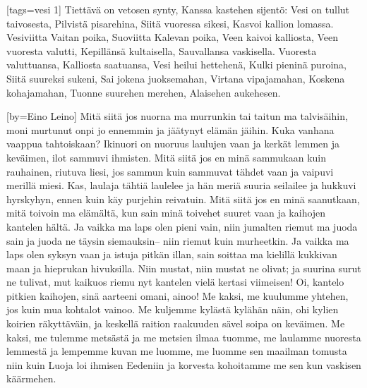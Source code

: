 [tags={vesi 1}]
  \beginverse
    Tiettävä on vetosen synty,
    Kanssa kastehen sijentö:
    Vesi on tullut taivosesta,
    Pilvistä pisarehina,
    Siitä vuoressa sikesi,
    Kasvoi kallion lomassa.
    Vesiviitta Vaitan poika,
    Suoviitta Kalevan poika,
    Veen kaivoi kalliosta,
    Veen vuoresta valutti,
    Kepillänsä kultaisella,
    Sauvallansa vaskisella.
  \endverse
  \beginverse
    Vuoresta valuttuansa,
    Kalliosta saatuansa,
    Vesi heilui hettehenä,
    Kulki pieninä puroina,
    Siitä suureksi sukeni,
    Sai jokena juoksemahan,
    Virtana vipajamahan,
    Koskena kohajamahan,
    Tuonne suurehen merehen,
    Alaisehen aukehesen.
  \endverse
\endsong


\sclearpage
{}[by={Eino Leino}]
  \beginverse
    Mitä siitä jos nuorna ma murrunkin
    tai taitun ma talvisäihin,
    moni murtunut onpi jo ennemmin
    ja jäätynyt elämän jäihin.
    Kuka vanhana vaappua tahtoiskaan?
    Ikinuori on nuoruus laulujen vaan
    ja kerkät lemmen ja keväimen,
    ilot sammuvi ihmisten.
  \endverse
  \beginverse
    Mitä siitä jos en minä sammukaan
    kuin rauhainen, riutuva liesi,
    jos sammun kuin sammuvat tähdet vaan
    ja vaipuvi merillä miesi.
    Kas, laulaja tähtiä laulelee
    ja hän meriä suuria seilailee
    ja hukkuvi hyrskyhyn, ennen kuin
    käy purjehin reivatuin.
  \endverse
  \beginverse
    Mitä siitä jos en minä saanutkaan,
    mitä toivoin ma elämältä,
    kun sain minä toivehet suuret vaan
    ja kaihojen kantelen hältä.
    Ja vaikka ma laps olen pieni vain,
    niin jumalten riemut ma juoda sain
    ja juoda ne täysin siemauksin--
    niin riemut kuin murheetkin.
  \endverse
  \beginverse
    Ja vaikka ma laps olen syksyn vaan
    ja istuja pitkän illan,
    sain soittaa ma kielillä kukkivan maan
    ja hieprukan hivuksilla.
    Niin mustat, niin mustat ne olivat;
    ja suurina surut ne tulivat,
    mut kaikuos riemu nyt kantelen
    vielä kertasi viimeisen!
  \endverse
  \beginverse
    Oi, kantelo pitkien kaihojen,
    sinä aarteeni omani, ainoo!
    Me kaksi, me kuulumme yhtehen,
    jos kuin mua kohtalot vainoo.
    Me kuljemme kylästä kylähän näin,
    ohi kylien koirien räkyttäväin,
    ja keskellä raition raakuuden
    sävel soipa on keväimen.
  \endverse
  \beginverse
    Me kaksi, me tulemme metsästä
    ja me metsien ilmaa tuomme,
    me laulamme nuoresta lemmestä
    ja lempemme kuvan me luomme,
    me luomme sen maailman tomusta niin
    kuin Luoja loi ihmisen Eedeniin
    ja korvesta kohoitamme me sen
    kun vaskisen käärmehen.
  \endverse
